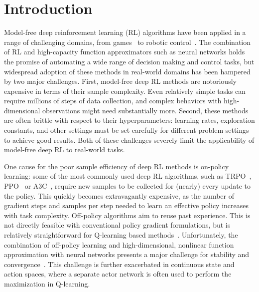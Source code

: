 \section{Introduction}

Model-free deep reinforcement learning (RL) algorithms have been applied in a range of challenging domains, from games~\citep{mnih2013playing,silver2016mastering} to robotic control~\citep{gu2017deeprobot,haarnoja2018composable}. The combination of RL and high-capacity function approximators such as neural networks holds the promise of automating a wide range of decision making and control tasks, but widespread adoption of these methods in real-world domains has been hampered by two major challenges. First, model-free deep RL methods are notoriously expensive in terms of their sample complexity. Even relatively simple tasks can require millions of steps of data collection, and complex behaviors with high-dimensional observations might need substantially more. Second, these methods are often brittle with respect to their hyperparameters: learning rates, exploration constants, and other settings must be set carefully for different problem settings to achieve good results. Both of these challenges severely limit the applicability of model-free deep RL to real-world tasks.

One cause for the poor sample efficiency of deep RL methods is on-policy learning: some of the most commonly used deep RL algorithms, such as TRPO~\cite{schulman2015trust}, PPO~\citep{schulman2017proximal} or A3C~\citep{mnih2016asynchronous}, require new samples to be collected for (nearly) every update to the policy. This quickly becomes extravagantly expensive, as the number of gradient steps and samples per step needed to learn an effective policy increases with task complexity. Off-policy algorithms aim to reuse past experience. This is not directly feasible with conventional policy gradient formulations, but is relatively straightforward for Q-learning based methods~\citep{mnih2015human}. Unfortunately, the combination of off-policy learning and high-dimensional, nonlinear function approximation with neural networks presents a major challenge for stability and convergence~\citep{bhatnagar2009convergent}.
This challenge is further exacerbated in continuous state and action spaces, where a separate actor network is often used to perform the maximization in Q-learning. 

